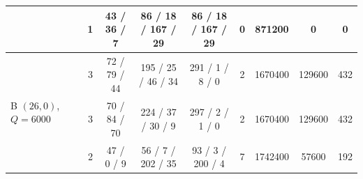 \begin{table}[t]
\begin{tabular}{@{}llcccccccc@{}}
  & \modelc{} & 1 & 43 / 36 / 7  & 86 / 18 / 167 / 29 & 86 / 18 / 167 / 29 & 0 & \num{871200}  & 0 & 0 \\
\midrule
\multirow{3}{*}{B $(26,0)$, $Q{=}6000$}
  & \modejc{} & 3 & 72 / 79 / 44 & 195 / 25 / 46 / 34 & 291 / 1 / 8 / 0   & 2 & \num{1670400} & \num{129600} & \num{432} \\
  & \modesc{} & 3 & 70 / 84 / 70 & 224 / 37 / 30 / 9  & 297 / 2 / 1 / 0   & 2 & \num{1670400} & \num{129600} & \num{432} \\
  & \modelc{} & 2 & 47 / 0 / 9   & 56 / 7 / 202 / 35  & 93 / 3 / 200 / 4  & 7 & \num{1742400} & \num{57600}  & \num{192} \\
\bottomrule
\end{tabular}
\end{table}
